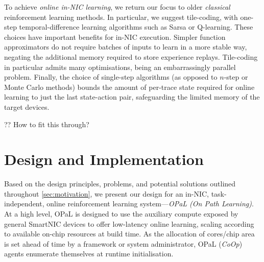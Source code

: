 \documentclass[sigconf,natbib=false]{acmart}
\newcommand{\approach}{On Path Learning}
\newcommand{\approachshort}{OPaL}
\newcommand{\Coopfw}{\emph{CoOp}}
\begin{document}
To achieve \emph{online in-NIC learning}, we return our focus to older \emph{classical} reinforcement learning methods.
In particular, we suggest tile-coding, with one-step temporal-difference learning algorithms such as Sarsa or Q-learning.
These choices have important benefits for in-NIC execution.
Simpler function approximators do not require batches of inputs to learn in a more stable way, negating the additional memory required to store experience replays.
Tile-coding in particular admits many optimisations, being an embarrassingly parallel problem.
Finally, the choice of single-step algorithms (as opposed to $n$-step or Monte Carlo methods) bounds the amount of per-trace state required for online learning to just the last state-action pair, safeguarding the limited memory of the target devices.

?? How to fit this through?

\section{Design and Implementation}\label{sec:design}
Based on the design principles, problems, and potential solutions outlined throughout \cref{sec:motivation}, we present our design for an in-NIC, task-independent, online reinforcement learning system---\emph{\approachshort{} (\approach)}.
At a high level, \approachshort{} is designed to use the auxiliary compute exposed by general SmartNIC devices to offer low-latency online learning, scaling according to available on-chip resources at build time.
As the allocation of cores/chip area is set ahead of time by a framework or system administrator, \approachshort{} (\Coopfw) agents enumerate themselves at runtime initialisation.
\end{document}
